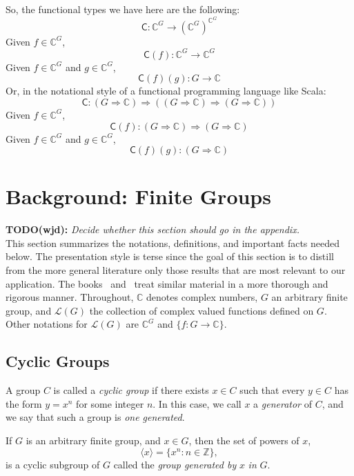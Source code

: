 \documentclass[reqno,onecolumn,oneside]{paper}
\newcommand{\<}{\ensuremath{\langle}}
\renewcommand{\>}{\ensuremath{\rangle}}
\newcommand{\field}[1]{\ensuremath{\mathbb{#1}}}
\newcommand{\Z}{\field{Z}}                   %
\newcommand{\C}{\field{C}}                   %
\newcommand{\vs}[1]{\ensuremath{\mathcal{#1}}}
\newcommand{\LG}{\vs{L}(G)}        %
\newcommand{\lt}[1]{\ensuremath{\mathsf{#1}}}
\newcommand\conv{\lt{C}}
\newcommand{\todo}[1]{
     {\bf TODO(wjd):} \emph{#1}\\
     }
\begin{document}
So, the functional types we have here are the following:
\[
\conv : \C^G \rightarrow (\C^G)^{\C^G}
\]
Given $f\in \C^G$,
\[
\conv(f) : \C^G \rightarrow \C^G
\]
Given $f\in \C^G$ and $g\in \C^G$,
\[
\conv(f)(g) : G \rightarrow \C
\]
Or, in the notational style of a functional programming language like Scala:
\[
\conv : (G \Rightarrow \C) \Rightarrow ( (G \Rightarrow \C) \Rightarrow (G \Rightarrow \C) )
\]
Given $f\in \C^G$,
\[
\conv(f) : (G \Rightarrow \C) \Rightarrow (G \Rightarrow \C)
\]
Given $f\in \C^G$ and $g\in \C^G$,
\[
\conv(f)(g) : (G \Rightarrow \C)
\]


\section{Background: Finite Groups}
\label{sec:hafg}
\todo{Decide whether this section should go in the appendix.}

This section summarizes the notations, definitions, and important facts needed
below. The presentation style is terse since the goal of this section is to
distill from the more general literature only those results that are most
relevant to our application. 
The books~\cite{An:2003} and~\cite{Tolimieri:1998} treat similar material in a
more thorough and rigorous manner. Throughout, $\C$ denotes complex numbers, 
$G$ an arbitrary finite group, and $\LG$ the collection of complex valued
functions defined on $G$. Other notations for $\LG$ are $\C^G$ and 
$\{f : G \rightarrow \C\}$.

\subsection{Cyclic Groups}
A group $C$ is called a \emph{cyclic group} if there exists $x\in C$ such that
every $y\in C$ has the form $y=x^n$ for some integer $n$.  In this case, we call
$x$ a \emph{generator} of $C$, and we say that such a group is \emph{one generated}.

If $G$ is an arbitrary finite group, and $x\in G$, then the set of powers of $x$,
\begin{equation}
  \label{eq:cyclic-group}
\<x\> = \{x^n : n\in \Z\},
\end{equation}
is a cyclic subgroup of $G$ called the 
\emph{group generated by} $x$ \emph{in} $G$.
\end{document}
